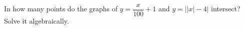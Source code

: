 In how many points do the graphs of $y=\dfrac{x}{100}+1$ and $y=\big||x|-4\big|$ intersect? Solve it algebraically.
